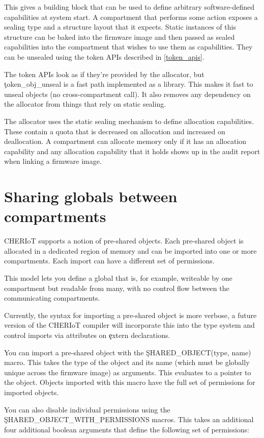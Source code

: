 This gives a building block that can be used to define arbitrary software-defined capabilities at system start.
A compartment that performs some action exposes a sealing type and a structure layout that it expects.
Static instances of this structure can be baked into the firmware image and then passed as sealed capabilities into the compartment that wishes to use them as capabilities.
They can be unsealed using the token APIs described in \ref{token_apis}.

The token APIs look as if they're provided by the allocator, but \c{token_obj_unseal} is a fast path implemented as a library.
This makes it fast to unseal objects (no cross-compartment call).
It also removes any dependency on the allocator from things that rely on static sealing.

The allocator uses the static sealing mechanism to define allocation capabilities.
These contain a quota that is decreased on allocation and increased on deallocation.
A compartment can allocate memory only if it has an allocation capability and any allocation capability that it holds shows up in the audit report when linking a firmware image.

\section{Sharing globals between compartments}

CHERIoT supports a notion of pre-shared objects.
Each pre-shared object is allocated in a dedicated region of memory and can be imported into one or more compartments.
Each import can have a different set of permissions.

This model lets you define a global that is, for example, writeable by one compartment but readable from many, with no control flow between the communicating compartments.

Currently, the syntax for importing a pre-shared object is more verbose, a future version of the CHERIoT compiler will incorporate this into the type system and control imports via attributes on \c{extern} declarations.

You can import a pre-shared object with the \c{SHARED_OBJECT(type, name)} macro.
This takes the type of the object and its name (which must be globally unique across the firmware image) as arguments.
This evaluates to a pointer to the object.
Objects imported with this macro have the full set of permissions for imported objects.

You can also disable individual permissions using the \c{SHARED_OBJECT_WITH_PERMISSIONS} macros.
This takes an additional four additional boolean arguments that define the following set of permissions:

